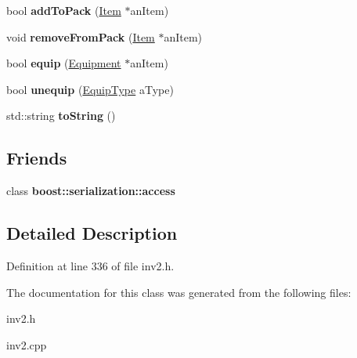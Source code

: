 \begin{DoxyCompactItemize}
bool {\bfseries add\+To\+Pack} (\hyperlink{class_item}{Item} $\ast$an\+Item)
\item 
\hypertarget{class_inventory_a061ffa9b738372bfcaee6d8ea5140d05}{}\label{class_inventory_a061ffa9b738372bfcaee6d8ea5140d05} 
void {\bfseries remove\+From\+Pack} (\hyperlink{class_item}{Item} $\ast$an\+Item)
\item 
\hypertarget{class_inventory_a7d9e9f5217573c9052484543e481ead1}{}\label{class_inventory_a7d9e9f5217573c9052484543e481ead1} 
bool {\bfseries equip} (\hyperlink{class_equipment}{Equipment} $\ast$an\+Item)
\item 
\hypertarget{class_inventory_aa5cd8a3fd8309a9f2a23b595b24b6fb5}{}\label{class_inventory_aa5cd8a3fd8309a9f2a23b595b24b6fb5} 
bool {\bfseries unequip} (\hyperlink{class_equip_type}{Equip\+Type} a\+Type)
\item 
\hypertarget{class_inventory_aa9cfa40da293bf94acc9f0c8fbe9a7d1}{}\label{class_inventory_aa9cfa40da293bf94acc9f0c8fbe9a7d1} 
std\+::string {\bfseries to\+String} ()
\end{DoxyCompactItemize}
\subsection*{Friends}
\begin{DoxyCompactItemize}
\item 
\hypertarget{class_inventory_ac98d07dd8f7b70e16ccb9a01abf56b9c}{}\label{class_inventory_ac98d07dd8f7b70e16ccb9a01abf56b9c} 
class {\bfseries boost\+::serialization\+::access}
\end{DoxyCompactItemize}


\subsection{Detailed Description}


Definition at line 336 of file inv2.\+h.



The documentation for this class was generated from the following files\+:\begin{DoxyCompactItemize}
\item 
inv2.\+h\item 
inv2.\+cpp\end{DoxyCompactItemize}
